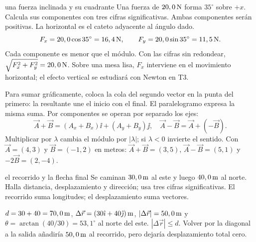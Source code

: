 \documentclass[11pt,a4paper]{article}
\begin{document}
\begin{examplebox}{una fuerza inclinada y su cuadrante}
 Una fuerza de $20,0\,\mathrm{N}$ forma $35^\circ$ sobre $+x$.
Calcula sus componentes con tres cifras significativas.
\solutionblock
{} Ambas componentes ser\'an positivas. La horizontal es el cateto
adyacente al \'angulo dado.
\[
F_x=20,0\cos35^\circ=16,4\,\mathrm{N},\qquad
F_y=20,0\sin35^\circ=11,5\,\mathrm{N}.
\]
 Cada componente es menor que el m\'odulo.
Con las cifras sin redondear, $\sqrt{F_x^2+F_y^2}=20,0\,\mathrm{N}$.
Sobre una mesa lisa, $F_x$ interviene en el movimiento horizontal;
el efecto vertical se estudiar\'a con Newton en T3.
\end{examplebox}

Para sumar gr\'aficamente, coloca la cola del segundo vector en la punta del primero:
la resultante une el inicio con el final. El paralelogramo expresa la misma suma.
Por componentes se operan por separado los ejes:
\[
\vec A+\vec B=(A_x+B_x)\ii+(A_y+B_y)\jj,\quad
\vec A-\vec B=\vec A+(-\vec B).
\]
Multiplicar por $\lambda$ cambia el m\'odulo por $|\lambda|$; si $\lambda<0$ invierte el
sentido. Con $\vec A=(4,3)$ y $\vec B=(-1,2)$ en metros:
$\vec A+\vec B=(3,5)$, $\vec A-\vec B=(5,1)$ y $-2\vec B=(2,-4)$.

\begin{examplebox}{el recorrido y la flecha final}
 Se caminan $30,0\,\mathrm{m}$ al este y luego $40,0\,\mathrm{m}$ al norte.
Halla distancia, desplazamiento y direcci\'on; usa tres cifras significativas.
\solutionblock
{} El recorrido suma longitudes; el desplazamiento suma vectores.
\begin{center}
\end{center}
 $d=30+40=70,0\,\mathrm{m}$,
$\Delta\vec r=(30\hat{\imath}+40\hat{\jmath})\,\mathrm{m}$,
$|\Delta\vec r|=50,0\,\mathrm{m}$ y $\theta=\arctan(40/30)=53,1^\circ$ al norte del este.
 $|\Delta\vec r|\le d$. Volver por la diagonal a la salida
a\~nadir\'ia $50,0\,\mathrm{m}$ al recorrido, pero dejar\'ia desplazamiento total cero.
\end{examplebox}
\end{document}
